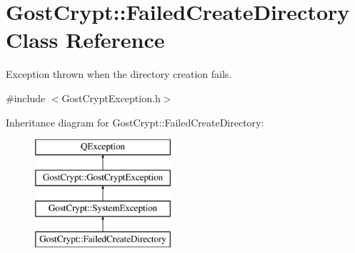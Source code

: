\hypertarget{class_gost_crypt_1_1_failed_create_directory}{}\section{Gost\+Crypt\+:\+:Failed\+Create\+Directory Class Reference}
\label{class_gost_crypt_1_1_failed_create_directory}


Exception thrown when the directory creation fails.  




{\ttfamily \#include $<$Gost\+Crypt\+Exception.\+h$>$}

Inheritance diagram for Gost\+Crypt\+:\+:Failed\+Create\+Directory\+:\begin{figure}[H]
\begin{center}
\leavevmode
\includegraphics[height=4.000000cm]{class_gost_crypt_1_1_failed_create_directory}
\end{center}
\end{figure}
